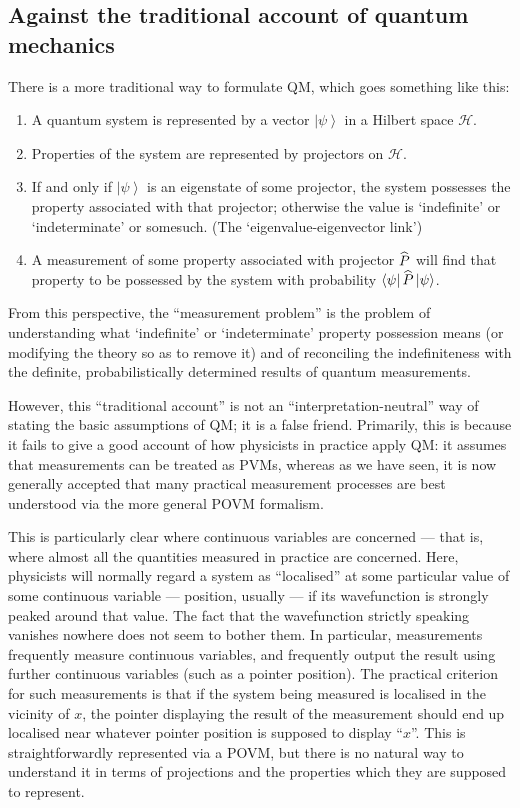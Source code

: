 \documentclass[12pt]{article}
\newcommand{\mc}[1]{\ensuremath{\mathcal{#1}}}
\newcommand{\ket}[1]{\ensuremath{\left|  #1 \right\rangle}}
\newcommand{\bra}[1]{\ensuremath{\left\langle #1 \right|}}
\newcommand{\matel}[3]{\ensuremath{\bra{#1} #2 \ket{#3}}}
\newcommand{\op}[1]{\ensuremath{\widehat{\textsf{\ensuremath{#1}}}}}
\begin{document}
 \subsection{Against the traditional account of quantum mechanics}\label{DMWWagainst}

 There is a more traditional way to formulate QM, which goes something like this:
\begin{enumerate}
\item A quantum system is represented by a vector \ket{\psi} in a Hilbert space \mc{H}.
\item Properties of the system are represented by projectors on \mc{H}.
\item If and only if \ket{\psi} is an eigenstate of some projector, the system possesses the property associated with that projector; otherwise the value is `indefinite' or `indeterminate' or somesuch. (The `eigenvalue-eigenvector link')
\item A measurement of some property associated with projector \op{P} will find that property to be possessed by the system with probability \matel{\psi}{\op{P}}{\psi}.
\end{enumerate} 
From this perspective, the ``measurement problem'' is the problem of understanding what `indefinite' or `indeterminate' property possession means (or modifying the theory so as to remove it) and of reconciling the indefiniteness with the definite, probabilistically determined results of quantum measurements.

However,  this ``traditional account'' is not an ``interpretation-neutral'' way of stating the basic assumptions of QM; it is a false friend. Primarily, this is because it fails  to give a good account of how physicists in practice apply QM:  it assumes that measurements can be treated as PVMs, whereas as we have seen, it is now generally accepted that many practical measurement processes are best understood via the more general POVM formalism.

This is particularly clear where continuous variables are concerned --- that is, where almost all the quantities measured in practice are concerned. Here, physicists will normally regard a system as ``localised'' at some particular value of some continuous variable --- position, usually --- if its wavefunction is strongly peaked around that value. The fact that the wavefunction strictly speaking vanishes nowhere does not seem to bother them. In particular,  measurements frequently measure continuous variables, and frequently output the result using further continuous variables (such as a pointer position). The practical criterion for such measurements is that if the system being measured is localised in the vicinity of $x$, the pointer displaying the result of the measurement should end up localised near whatever pointer position is supposed to display ``$x$''. This is straightforwardly represented via a POVM, but there is no natural way to understand it in terms of projections and the properties which they are supposed to represent.
\end{document}
